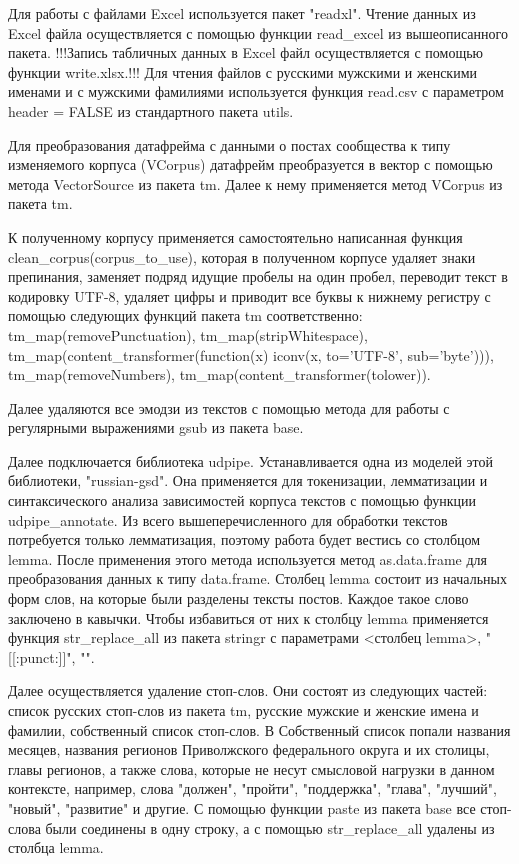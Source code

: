 \documentclass[bachelor, och, coursework ]{SCWorks}
\begin{document}
Для работы с файлами Excel используется пакет "readxl". Чтение данных из Excel файла осуществляется с помощью функции read_excel из вышеописанного пакета. 
!!!Запись табличных данных в Excel файл осуществляется с помощью функции write.xlsx.!!!
Для чтения файлов с русскими мужскими и женскими именами и с мужскими фамилиями используется функция read.csv с параметром header = FALSE из стандартного пакета utils. 

Для преобразования датафрейма с данными о постах сообщества к типу изменяемого корпуса (VCorpus) датафрейм преобразуется в вектор с помощью метода VectorSource из пакета tm. Далее к нему применяется метод VСorpus из пакета tm.

К полученному корпусу применяется самостоятельно написанная функция clean\_corpus(corpus\_to\_use), которая в полученном корпусе удаляет знаки препинания, заменяет подряд идущие пробелы на один пробел, переводит текст в кодировку UTF-8, удаляет цифры и приводит все буквы к нижнему регистру с помощью следующих функций пакета tm соответственно: tm\_map(removePunctuation), tm\_map(stripWhitespace), tm\_map(content\_transformer(function(x) iconv(x, to='UTF-8', sub='byte'))), tm\_map(removeNumbers), tm\_map(content\_transformer(tolower)).

Далее удаляются все эмодзи из текстов с помощью метода для работы с регулярными выражениями gsub из пакета base.

Далее подключается библиотека udpipe. Устанавливается одна из моделей этой библиотеки, "russian-gsd". Она применяется для токенизации, лемматизации и синтаксического анализа зависимостей корпуса текстов с помощью функции udpipe\_annotate. Из всего вышеперечисленного для обработки текстов потребуется только лемматизация, поэтому работа будет вестись со столбцом lemma. После применения этого метода используется метод as.data.frame для преобразования данных к типу data.frame. Столбец lemma состоит из начальных форм слов, на которые были разделены тексты постов. Каждое такое слово заключено в кавычки. Чтобы избавиться от них к столбцу lemma применяется функция str\_replace\_all из пакета stringr с параметрами <столбец lemma>, "[[:punct:]]", "".

Далее осуществляется удаление стоп-слов. Они состоят из следующих частей: список русских стоп-слов из пакета tm, русские мужские и женские имена и фамилии, собственный список стоп-слов. В Собственный список попали названия месяцев, названия регионов  Приволжского федерального округа и их столицы, главы регионов, а также слова, которые не несут смысловой нагрузки в данном контексте, например, слова "должен", "пройти", "поддержка", "глава", "лучший", "новый", "развитие" и другие. С помощью функции paste из пакета base все стоп-слова были соединены в одну строку, а с помощью str\_replace\_all удалены из столбца lemma.
\end{document}
